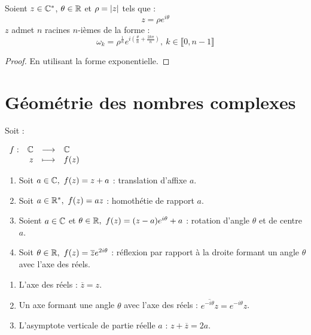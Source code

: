 \begin{proposition}
	Soient $z \in \mathbb{C}^*$, $\theta \in \mathbb{R}$ et $\rho = \abs{z}$ tels que :
	\[ z = \rho e^{i\theta} \]
	$z$ admet $n$ racines $n$-ièmes de la forme :
	\[ \omega_k = \rho^{\frac{1}{n}} e^{i \left( \frac{\theta}{n} + \frac{2 k \pi}{n} \right)},\ k \in \llbracket 0, n - 1 \rrbracket \]
\end{proposition}

\begin{proof}
	En utilisant la forme exponentielle.
\end{proof}

\section{Géométrie des nombres complexes}
\begin{proposition}
	Soit :
	\begin{center}
		$
		\begin{array}{rrcl} f : & \mathbb{C} & \longrightarrow & \mathbb{C} \\ & z & \longmapsto & f(z) \end{array}
		$
	\end{center}
	\begin{enumerate}
		\item Soit $a \in \mathbb{C},\ f(z) = z + a$ : translation d'affixe $a$.
		\item Soit $a \in \mathbb{R}^*,\ f(z) = az$ : homothétie de rapport $a$.
		\item Soient $a \in \mathbb{C}$ et $\theta \in \mathbb{R},\ f(z) = (z-a)e^{i\theta} + a$ : rotation d'angle $\theta$ et de centre $a$.
		\item Soit $\theta \in \mathbb{R},\ f(z) = \overline{z} e^{2i\theta}$ : réflexion par rapport à la droite formant un angle $\theta$ avec l'axe des réels.
	\end{enumerate}
\end{proposition}

\begin{proposition}
	
	\begin{enumerate}
		\item L'axe des réels : $\overline{z} = z$.
		\item Un axe formant une angle $\theta$ avec l'axe des réels : $\overline{e^{-i \theta}z} = e^{-i \theta} z$.
		\item L'asymptote verticale de partie réelle $a$ : $z + \overline{z} = 2a$.
	\end{enumerate}
\end{proposition}